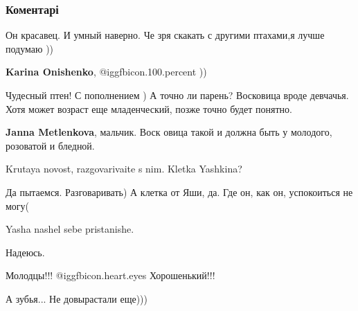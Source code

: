  
 
 
 
 
\subsubsection{Коментарі}

\begin{itemize} %
Он красавец. И умный наверно. Че зря скакать с другими птахами,я лучше подумаю ))

\textbf{Karina Onishenko},  @igg{fbicon.100.percent} ))


Чудесный птен! С пополнением ) А точно ли парень? Восковица вроде девчачья.
Хотя может возраст еще младенческий, позже точно будет понятно.

\textbf{Janna Metlenkova}, мальчик. Воск овица такой и должна быть у молодого, розоватой и бледной.

Krutaya novost, razgovarivaite s nim. Kletka Yashkina?

Да пытаемся. Разговаривать)
А клетка от Яши, да. Где он, как он, успокоиться не могу(

Yasha nashel sebe pristanishe.

Надеюсь.

Молодцы!!! @igg{fbicon.heart.eyes}  Хорошенький!!!

А зубья... Не довырастали еще)))

\end{itemize} %
